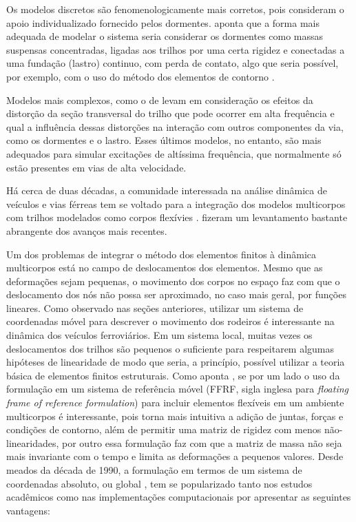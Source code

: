 Os modelos discretos são fenomenologicamente mais corretos, pois consideram o apoio individualizado fornecido pelos dormentes.  aponta que a forma mais adequada de modelar o sistema seria considerar os dormentes como massas suspensas concentradas, ligadas aos trilhos por uma certa rigidez e conectadas a uma fundação (lastro) continuo, com perda de contato, algo que seria possível, por exemplo, com o uso do método dos elementos de contorno \cite{sapountzakis_nonlinear_2010}.

Modelos mais complexos, como o de  levam em consideração os efeitos da distorção da seção transversal do trilho que pode ocorrer em alta frequência e qual a influência dessas distorções na interação com outros componentes da via, como os dormentes e o lastro. Esses últimos modelos, no entanto, são mais adequados para simular excitações de altíssima frequência, que normalmente só estão presentes em vias de alta velocidade.

Há cerca de duas décadas, a comunidade interessada na análise dinâmica de veículos e vias férreas tem se voltado para a integração dos modelos multicorpos com trilhos modelados como corpos flexívies \cite{schiehlen_computational_2006}.  fizeram um levantamento bastante abrangente dos avanços mais recentes. 

Um dos problemas de integrar o método dos elementos finitos à dinâmica multicorpos está no campo de deslocamentos dos elementos. Mesmo que as deformações sejam pequenas, o movimento dos corpos no espaço faz com que o deslocamento dos nós não possa ser aproximado, no caso mais geral, por funções lineares. Como observado nas seções anteriores, utilizar um sistema de coordenadas móvel para descrever o movimento dos rodeiros é interessante na dinâmica dos veículos ferroviários. Em um sistema local, muitas vezes os deslocamentos dos trilhos são pequenos o suficiente para respeitarem algumas hipóteses de linearidade de modo que seria, a princípio, possível utilizar a teoria básica de elementos finitos estruturais. Como aponta , se por um lado o uso da formulação em um sistema de referência móvel (FFRF, sigla inglesa para \textit{floating frame of reference formulation}) para incluir elementos flexíveis em um ambiente multicorpos é interessante, pois torna mais intuitiva a adição de juntas, 
forças e condições de contorno, além de permitir uma matriz de rigidez com menos não-linearidades, por outro essa formulação faz com que a matriz de massa não seja mais invariante com o tempo e limita as deformações a pequenos valores. Desde meados da década de 1990, a formulação em termos de um sistema de coordenadas absoluto, ou global \cite{shabana_dynamics_2005}, tem se popularizado tanto nos estudos acadêmicos como nas implementações computacionais por apresentar as seguintes vantagens:

